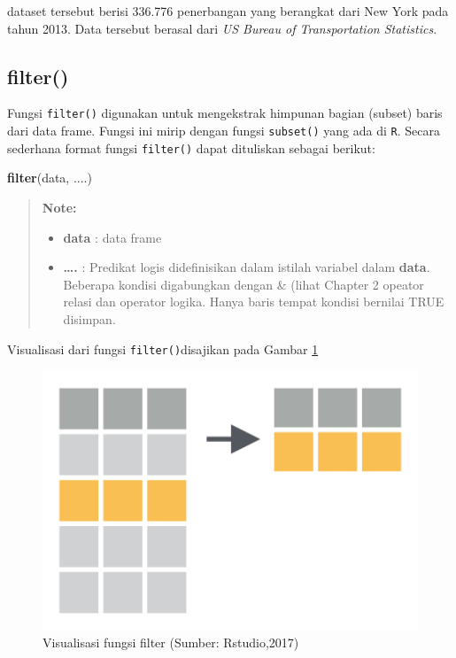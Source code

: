 \documentclass[]{book}
\newenvironment{Shaded}{\begin{snugshade}}{\end{snugshade}}
\newcommand{\KeywordTok}[1]{\textcolor[rgb]{0.13,0.29,0.53}{\textbf{#1}}}
\newcommand{\NormalTok}[1]{#1}
\providecommand{\tightlist}{%
  \setlength{\itemsep}{0pt}\setlength{\parskip}{0pt}}
\begin{document}
dataset tersebut berisi 336.776 penerbangan yang berangkat dari New York
pada tahun 2013. Data tersebut berasal dari \emph{US Bureau of
Transportation Statistics}.

\subsection{filter()}\label{filter}

Fungsi \texttt{filter()} digunakan untuk mengekstrak himpunan bagian
(subset) baris dari data frame. Fungsi ini mirip dengan fungsi
\texttt{subset()} yang ada di \texttt{R}. Secara sederhana format fungsi
\texttt{filter()} dapat dituliskan sebagai berikut:

\begin{Shaded}
\begin{Highlighting}[]
\KeywordTok{filter}\NormalTok{(data, ....)}
\end{Highlighting}
\end{Shaded}

\begin{quote}
\textbf{Note: }

\begin{itemize}
\tightlist
\item
  \textbf{data} : data frame
\item
  \textbf{\ldots{}.} : Predikat logis didefinisikan dalam istilah
  variabel dalam \textbf{data}. Beberapa kondisi digabungkan dengan \&
  (lihat Chapter 2 opeator relasi dan operator logika. Hanya baris
  tempat kondisi bernilai TRUE disimpan.
\end{itemize}
\end{quote}

Visualisasi dari fungsi \texttt{filter()}disajikan pada Gambar
\ref{fig:filtervis}

\begin{figure}

{\centering \includegraphics[width=5.69in]{filtervis} 

}

\caption{Visualisasi fungsi filter (Sumber: Rstudio,2017)}\label{fig:filtervis}
\end{figure}
\end{document}
